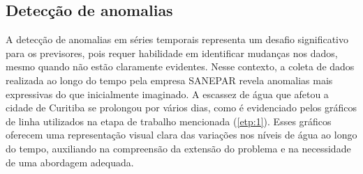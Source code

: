 

\subsection{Detec\c c\~ao de anomalias} \label{subsec:detec}



A detecção de anomalias em séries temporais representa um desafio significativo para os previsores, pois requer habilidade em identificar mudanças nos dados, mesmo quando não estão claramente evidentes. Nesse contexto, a coleta de dados realizada ao longo do tempo pela empresa SANEPAR revela anomalias mais expressivas do que inicialmente imaginado. A escassez de água que afetou a cidade de Curitiba se prolongou por vários dias, como é evidenciado pelos gráficos de linha utilizados na etapa de trabalho mencionada (\ref{etp:1}). Esses gráficos oferecem uma representação visual clara das variações nos níveis de água ao longo do tempo, auxiliando na compreensão da extensão do problema e na necessidade de uma abordagem adequada.

